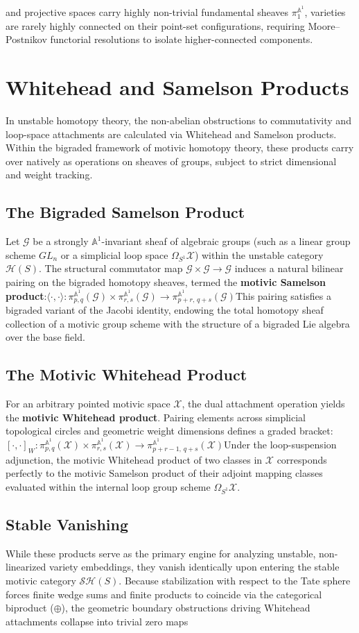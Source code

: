 \documentclass[11pt,oneside]{article}
\begin{document}
\begin{enumerate}
and projective spaces carry highly non-trivial fundamental sheaves $\pi_1^{\mathbb{A}^1}$, varieties are rarely highly connected on their point-set configurations, requiring Moore--Postnikov functorial resolutions to isolate higher-connected components.\section{Whitehead and Samelson Products}In unstable homotopy theory, the non-abelian obstructions to commutativity and loop-space attachments are calculated via Whitehead and Samelson products. Within the bigraded framework of motivic homotopy theory, these products carry over natively as operations on sheaves of groups, subject to strict dimensional and weight tracking.\subsection{The Bigraded Samelson Product}Let $\mathcal{G}$ be a strongly $\mathbb{A}^1$-invariant sheaf of algebraic groups (such as a linear group scheme $GL_n$ or a simplicial loop space $\Omega_{S^1}\mathcal{X}$) within the unstable category $\mathcal{H}(S)$. The structural commutator map $\mathcal{G} \times \mathcal{G} \to \mathcal{G}$ induces a natural bilinear pairing on the bigraded homotopy sheaves, termed the \textbf{motivic Samelson product}:\(\langle \cdot ,\cdot \rangle :\pi _{p,q}^{\mathbb{A}^{1}}(\mathcal{G})\times \pi _{r,s}^{\mathbb{A}^{1}}(\mathcal{G})\longrightarrow \pi _{p+r,\,q+s}^{\mathbb{A}^{1}}(\mathcal{G})\)This pairing satisfies a bigraded variant of the Jacobi identity, endowing the total homotopy sheaf collection of a motivic group scheme with the structure of a bigraded Lie algebra over the base field.\subsection{The Motivic Whitehead Product}For an arbitrary pointed motivic space $\mathcal{X}$, the dual attachment operation yields the \textbf{motivic Whitehead product}. Pairing elements across simplicial topological circles and geometric weight dimensions defines a graded bracket:\([\cdot ,\cdot ]_{W}:\pi _{p,q}^{\mathbb{A}^{1}}(\mathcal{X})\times \pi _{r,s}^{\mathbb{A}^{1}}(\mathcal{X})\longrightarrow \pi _{p+r-1,\,q+s}^{\mathbb{A}^{1}}(\mathcal{X})\)Under the loop-suspension adjunction, the motivic Whitehead product of two classes in $\mathcal{X}$ corresponds perfectly to the motivic Samelson product of their adjoint mapping classes evaluated within the internal loop group scheme $\Omega_{S^1}\mathcal{X}$.\subsection{Stable Vanishing}While these products serve as the primary engine for analyzing unstable, non-linearized variety embeddings, they vanish identically upon entering the stable motivic category $\mathcal{S}\mathcal{H}(S)$. Because stabilization with respect to the Tate sphere forces finite wedge sums and finite products to coincide via the categorical biproduct ($\oplus$), the geometric boundary obstructions driving Whitehead attachments collapse into trivial zero maps 
\end{enumerate}
\end{document}
